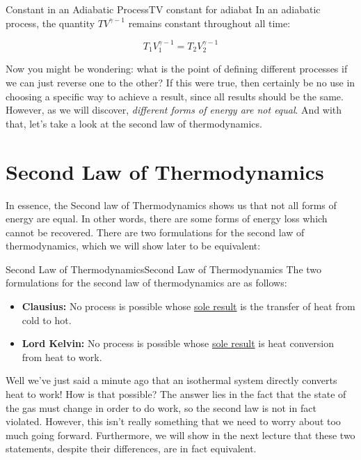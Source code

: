 \begin{theorem}{Constant in an Adiabatic Process}{TV constant for adiabat}
In an adiabatic process, the quantity $TV^{\gamma -1}$ remains constant throughout all time:

\[ T_1V_1^{\gamma -1} = T_2V_2^{\gamma - 1}\]
\end{theorem}

Now you might be wondering: what is the point of defining different processes if we can just reverse one to the other? If this were true, then certainly be no use in choosing a specific way to achieve a result, since all results should be the same. However, as we will discover, \textit{different forms of energy are not equal}. And with that, let's take a look at the second law of thermodynamics. 

\section{Second Law of Thermodynamics}

In essence, the Second law of Thermodynamics shows us that not all forms of energy are equal. In other words, there are some forms of energy loss which cannot be recovered. There are two formulations for the second law of thermodynamics, which we will show later to be equivalent: 

\begin{theorem}{Second Law of Thermodynamics}{Second Law of Thermodynamics}
The two formulations for the second law of thermodynamics are as follows: 

\begin{itemize}
  \item \textbf{Clausius:} No process is possible whose \underline{sole result} is the transfer of heat from cold to hot.
  \item \textbf{Lord Kelvin:} No process is possible whose \underline{sole result} is heat conversion from heat to work.
\end{itemize}
\end{theorem}

Well we've just said a minute ago that an isothermal system directly converts heat to work! How is that possible? The answer lies in the fact that the state of the gas must change in order to do work, so the second law is not in fact violated. However, this isn't really something that we need to worry about too much going forward. Furthermore, we will show in the next lecture that these two statements, despite their differences, are in fact equivalent.

